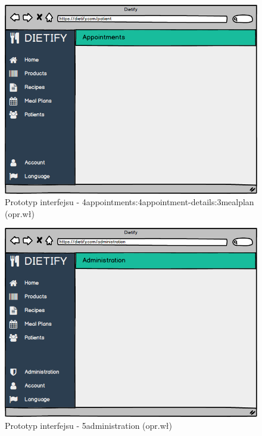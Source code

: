 \begin{minipage}{\textwidth}
    \begin{figure}[H]
        \centering\includegraphics[scale=0.55]{../mockup/4appointments_4appointment-details_3mealplan.png}
        \caption{Prototyp interfejsu - 4appointments:4appointment-details:3mealplan (opr.wł)}\label{rysunek:4appointments_4appointment-details_3mealplan}
    \end{figure}
\end{minipage}
\begin{minipage}{\textwidth}
    \begin{figure}[H]
        \centering\includegraphics[scale=0.55]{../mockup/5administration.png}
        \caption{Prototyp interfejsu - 5administration (opr.wł)}\label{rysunek:5administration}
    \end{figure}
\end{minipage}

